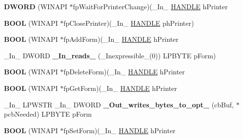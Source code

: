 \begin{DoxyCompactItemize}
{\bfseries D\+W\+O\+RD} (W\+I\+N\+A\+PI $\ast$fp\+Wait\+For\+Printer\+Change)(\+\_\+\+In\+\_\+ \hyperlink{interfacevoid}{H\+A\+N\+D\+LE} h\+Printer
\item 
\mbox{\label{struct___p_r_i_n_t_p_r_o_v_i_d_o_r_a30072c0c4d67901f6550a2800c8b8163}} 
{\bfseries B\+O\+OL} (W\+I\+N\+A\+PI $\ast$fp\+Close\+Printer)(\+\_\+\+In\+\_\+ \hyperlink{interfacevoid}{H\+A\+N\+D\+LE} ph\+Printer)
\item 
\mbox{\label{struct___p_r_i_n_t_p_r_o_v_i_d_o_r_a992fd84061662c0cd2ce9748535396ae}} 
{\bfseries B\+O\+OL} (W\+I\+N\+A\+PI $\ast$fp\+Add\+Form)(\+\_\+\+In\+\_\+ \hyperlink{interfacevoid}{H\+A\+N\+D\+LE} h\+Printer
\item 
\mbox{\label{struct___p_r_i_n_t_p_r_o_v_i_d_o_r_af747d1ae6f2f4c85fcb118a1db9fabb6}} 
\+\_\+\+In\+\_\+ D\+W\+O\+RD {\bfseries \+\_\+\+In\+\_\+reads\+\_\+} (\+\_\+\+Inexpressible\+\_\+(0)) L\+P\+B\+Y\+TE p\+Form)
\item 
\mbox{\label{struct___p_r_i_n_t_p_r_o_v_i_d_o_r_a031584a12a3df916a60141ca8b355aa1}} 
{\bfseries B\+O\+OL} (W\+I\+N\+A\+PI $\ast$fp\+Delete\+Form)(\+\_\+\+In\+\_\+ \hyperlink{interfacevoid}{H\+A\+N\+D\+LE} h\+Printer
\item 
\mbox{\label{struct___p_r_i_n_t_p_r_o_v_i_d_o_r_a14039b15ee6028a857b64cab8cd38e4b}} 
{\bfseries B\+O\+OL} (W\+I\+N\+A\+PI $\ast$fp\+Get\+Form)(\+\_\+\+In\+\_\+ \hyperlink{interfacevoid}{H\+A\+N\+D\+LE} h\+Printer
\item 
\mbox{\label{struct___p_r_i_n_t_p_r_o_v_i_d_o_r_a840f742f3093b74adbb1995028d2b4f7}} 
\+\_\+\+In\+\_\+ L\+P\+W\+S\+TR \+\_\+\+In\+\_\+ D\+W\+O\+RD {\bfseries \+\_\+\+Out\+\_\+writes\+\_\+bytes\+\_\+to\+\_\+opt\+\_\+} (cb\+Buf, $\ast$pcb\+Needed) L\+P\+B\+Y\+TE p\+Form
\item 
\mbox{\label{struct___p_r_i_n_t_p_r_o_v_i_d_o_r_a21eef60d8e77a548900030e6e2b8a0d6}} 
{\bfseries B\+O\+OL} (W\+I\+N\+A\+PI $\ast$fp\+Set\+Form)(\+\_\+\+In\+\_\+ \hyperlink{interfacevoid}{H\+A\+N\+D\+LE} h\+Printer

\end{DoxyCompactItemize}
